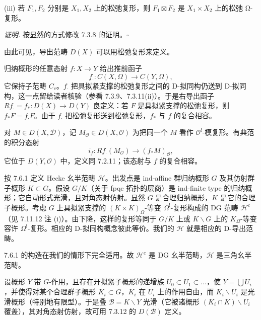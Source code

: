 

(iii) 若 $F_1,F_2$ 分别是 $X_1,X_2$ 上的松弛复形，则 $F_1\boxtimes F_2$ 是 $X_1\times X_2$ 上的松弛 Ω-复形。

\emph{证明.} 按显然的方式修改 7.3.8 的证明。\hfill$\square$

由此可见，导出范畴 $D(X)$ 可以用松弛复形来定义。

 归纳概形的任意态射 $f:X\to Y$ 给出推前函子
\[
f_{\cdot}:C(X,\Omega)\to C(Y,\Omega),
\]
它保持子范畴 $C_c$。$f_{\cdot}$ 把具拟紧支撑的松弛复形之间的 D-拟同构仍送到 D-拟同构，这一点留给读者核验（参看 7.3.9、7.3.11(ii)）。于是右导出函子 $Rf_{\cdot}=f_{*}:D(X)\to D(Y)$ 良定义：若 $F$ 是具拟紧支撑的松弛复形，则 $f_{*}F=f_{\cdot}F$。由于 $f_{\cdot}$ 把松弛复形送到松弛复形，$f_{*}$ 与 $f$ 的复合相容。

对 $M\in D(X,\mathcal{D})$，记 $M_{\mathcal{O}}\in D(X,\mathcal{O})$ 为把同一个 $M$ 看作 $\mathcal{O}^!$-模复形。有典范的积分态射
\[
i_f:Rf_{\cdot}(M_{\mathcal{O}})\to(f_{*}M)_{\mathcal{O}},
\]
它位于 $D(Y,\mathcal{O})$ 中，定义同 7.2.11；该态射与 $f$ 的复合相容。

 按 7.6.1 定义 Hecke 幺半范畴 $\mathcal{H}$。出发点是 ind-affine 群归纳概形 $G$ 及其仿射群子概形 $K\subset G$。假设 $G/K$（关于 fpqc 拓扑的层商）是 ind-finite type 的归纳概形；它自动形式光滑，且对角态射仿射。显然 $G$ 是合理归纳概形，$K$ 是它的合理子概形。考虑 $G$ 上具拟紧支撑的 $(K\times K)_{\Omega}$-等变 $\Omega^!$-复形构成的 DG 范畴 $\mathcal{H}^c$（见 7.11.12 注 (i)）。由下降，这样的复形等同于 $G/K$ 上或 $K\backslash G$ 上的 $K_{\Omega}$-等变容许 $\Omega^!$-复形。相应的 D-拟同构概念彼此等价。我们的 $\mathcal{H}$ 就是相应的 D-导出范畴。


7.6.1 的构造在我们的情形下完全适用。故 $\mathcal{H}^c$ 是 DG 幺半范畴，$\mathcal{H}$ 是三角幺半范畴。

 设概形 $Y$ 带 $G$-作用，且存在开拟紧子概形的递增族 $U_0\subset U_1\subset\ldots$，使 $Y=\bigcup U_i$，并使得对某个合理群子概形 $K_i\subset G$，$K_i$ 在 $U_i$ 上的作用自由，而 $K_i\backslash U_i$ 是光滑概形（特别地有限型）。于是叠 $\mathcal{B}=K\backslash Y$ 光滑（它被诸概形 $(K_i\cap K)\backslash U_i$ 覆盖），其对角态射仿射，故可用 7.3.12 的 $D(\mathcal{B})$ 定义。

